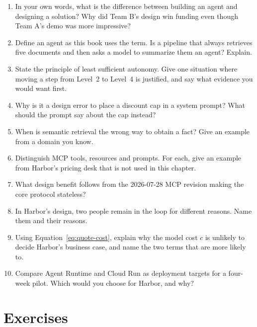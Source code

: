 \begin{enumerate}[itemsep=2pt]
  \item In your own words, what is the difference between building an agent and designing a solution? Why did Team B's design win funding even though Team A's demo was more impressive?
  \item Define an agent as this book uses the term. Is a pipeline that always retrieves five documents and then asks a model to summarize them an agent? Explain.
  \item State the principle of least sufficient autonomy. Give one situation where moving a step from Level~2 to Level~4 is justified, and say what evidence you would want first.
  \item Why is it a design error to place a discount cap in a system prompt? What should the prompt say about the cap instead?
  \item When is semantic retrieval the wrong way to obtain a fact? Give an example from a domain you know.
  \item Distinguish MCP tools, resources and prompts. For each, give an example from Harbor's pricing desk that is not used in this chapter.
  \item What design benefit follows from the 2026-07-28 MCP revision making the core protocol stateless?
  \item In Harbor's design, two people remain in the loop for different reasons. Name them and their reasons.
  \item Using Equation~\eqref{eq:quote-cost}, explain why the model cost $c$ is unlikely to decide Harbor's business case, and name the two terms that are more likely to.
  \item Compare Agent Runtime and Cloud Run as deployment targets for a four-week pilot. Which would you choose for Harbor, and why?
\end{enumerate}

\section*{Exercises}

